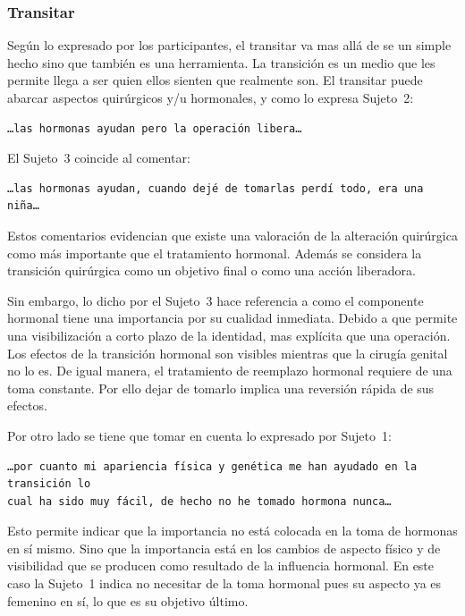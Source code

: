 \subsubsection{Transitar}

Según lo expresado por los participantes, el transitar va mas allá de se un
simple hecho sino que también es una herramienta. La transición es un medio que
les permite llega a ser quien ellos sienten que realmente son. El transitar
puede abarcar aspectos quirúrgicos y/u hormonales, y como lo expresa Sujeto~2:

\begin{verbatim}
…las hormonas ayudan pero la operación libera…
\end{verbatim}

El Sujeto~3 coincide al comentar:

\begin{verbatim}
…las hormonas ayudan, cuando dejé de tomarlas perdí todo, era una niña…
\end{verbatim}

Estos comentarios evidencian que existe una valoración de la alteración
quirúrgica como más importante que el tratamiento hormonal. Además se considera
la transición quirúrgica como un objetivo final o como una acción liberadora.

Sin embargo, lo dicho por el Sujeto~3 hace referencia a como el componente
hormonal tiene una importancia por su cualidad inmediata. Debido a que permite
una visibilización a corto plazo de la identidad, mas explícita que una
operación. Los efectos de la transición hormonal son visibles mientras que la
cirugía genital no lo es. De igual manera, el tratamiento de reemplazo hormonal
requiere de una toma constante. Por ello dejar de tomarlo implica una reversión
rápida de sus efectos.

Por otro lado se tiene que tomar en cuenta lo expresado por Sujeto~1:

\begin{verbatim}
…por cuanto mi apariencia física y genética me han ayudado en la transición lo
cual ha sido muy fácil, de hecho no he tomado hormona nunca…
\end{verbatim}

Esto permite indicar que la importancia no está colocada en la toma de hormonas
en sí mismo. Sino que la importancia está en los cambios de aspecto físico y de
visibilidad que se producen como resultado de la influencia hormonal. En este
caso la Sujeto~1 indica no necesitar de la toma hormonal pues su aspecto ya es
femenino en sí, lo que es su objetivo último.


